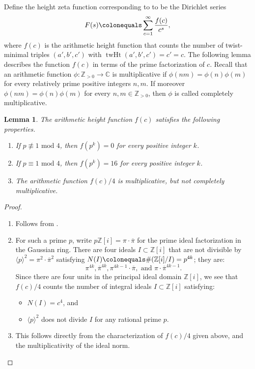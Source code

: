 \documentclass[12pt]{amsart}
\newcounter{counter}[section] %
\numberwithin{equation}{section} %
\newtheorem{lemma}[counter]{Lemma}
\theoremstyle{definition} \newtheorem{definition}[counter]{Definition}
\theoremstyle{remark} \newtheorem{nonexam}[counter]{Non-example}
\newcommand{\ZZ}{\mathbb{Z}} %
\newcommand{\CC}{\mathbb{C}} %
\newcommand{\md}{\text{ mod }} %
\newcommand{\cdef}[1]{\textsf{#1}} %
\DeclareMathOperator{\twht}{twHt} %
\begin{document}
Define the \cdef{height zeta function} corresponding to 
to be the Dirichlet series
\begin{equation*}
  F(s) \colonequals \sum_{c = 1}^\infty \dfrac{f(c)}{c^s},
\end{equation*}
where $f(c)$ is the \cdef{arithmetic height function} that counts the number of
twist-minimal triples $(a',b',c')$ with $\twht(a',b',c') = c' = c$. The
following lemma describes the function $f(c)$ in terms of the prime
factorization of $c$. Recall that an arithmetic function $\phi \colon \ZZ_{>0}
\to \CC$ is \cdef{multiplicative} if $\phi(nm) = \phi(n)\phi(m)$ for every
relatively prime positive integers $n,m$. If moreover $\phi(nm)=\phi(n)\phi(m)$
for every $n,m \in \ZZ_{>0}$, then $\phi$ is called \cdef{completely
multiplicative}.


\begin{lemma}
  \label{lemma:arithmetic-height-fun-f}
    The arithmetic height function $f(c)$ satisfies the following properties.
    \begin{enumerate}
        \item If $p \not\equiv 1 \md 4$, then $f(p^k) = 0$ for every positive integer $k$.
        \item If $p \equiv 1 \md 4$, then $f(p^k) = 16$ for every positive integer $k$.
        \item The arithmetic function $f(c)/4$ is multiplicative, but not
          completely multiplicative.
    \end{enumerate}
\end{lemma}
\begin{proof}
    \hfill
    \begin{enumerate}
        \item Follows from .
        \item For such a prime $p$, write $p\ZZ[i] = \pi\cdot\overline{\pi}$
          for the prime ideal factorization in the Gaussian ring. There are
          four ideals $I \subset \ZZ[i]$ that are not divisible by
          $\langle p \rangle^2 = \pi^2\cdot\overline{\pi}^2$ satisfying
          $N(I) \colonequals \#(\ZZ[i]/I) = p^{4k}$; they are:
        \begin{equation*}
          \pi^{4k}, \overline{\pi}^{4k}, \pi^{4k-1}\cdot\overline{\pi},
          \text{ and } \pi\cdot\overline{\pi}^{4k-1}.
        \end{equation*}
        Since there are four units in the principal ideal domain $\ZZ[i]$,
        we see that $f(c)/4$ counts the number of integral ideals $I \subset
        \ZZ[i]$ satisfying:
        \begin{itemize}
          \item $N(I) = c^4$, and
          \item $\langle p \rangle^2$ does not divide $I$ for any rational prime $p$.
        \end{itemize}
        \item This follows directly from the characterization of $f(c)/4$ given
          above, and the multiplicativity of the ideal norm.
    \end{enumerate}
\end{proof}
\end{document}
